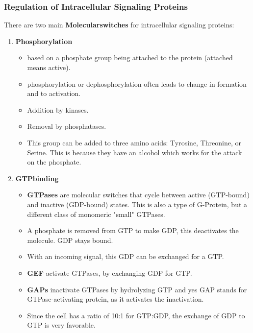 \documentclass[../main.tex]{subfiles}
\begin{document}
\subsubsection{Regulation of Intracellular Signaling Proteins}
\label{sec:GTP}

There are two main \textbf{\gls{Molecularswitches}} for intracellular signaling proteins:
\begin{enumerate}
	\item \textbf{\gls{Phosphorylation}} 
	\begin{itemize}
		\item based on a phosphate group being attached to the protein (attached means active).
		\item phosphorylation or dephosphorylation often leads to change in formation and to activation.
		\item Addition by kinases.
		\item Removal by phosphatases.
		\item This group can be added to three amino acids: Tyrosine, Threonine, or Serine. This is because they have an alcohol which works for the attack on the phosphate.
	\end{itemize}
	\item \textbf{\gls{GTPbinding}}
	\begin{itemize}
		\item  \textbf{\gls{GTPases}} are molecular switches that cycle between active (GTP-bound) and inactive (GDP-bound) states. This is also a type of G-Protein, but a different class of monomeric "small" GTPases.
		\item A phosphate is removed from GTP to make GDP, this deactivates the molecule. GDP stays bound.
		\item With an incoming signal, this GDP can be exchanged for a GTP.
		\item \textbf{\gls{GEF}} activate GTPases, by exchanging GDP for GTP.
		\item \textbf{\gls{GAP}s} inactivate GTPases by hydrolyzing GTP and yes GAP stands for GTPase-activating protein, as it activates the inactivation.
		\item Since the cell has a ratio of 10:1 for GTP:GDP, the exchange of GDP to GTP is very favorable.
	\end{itemize}
\end{enumerate}
	
\end{document}
